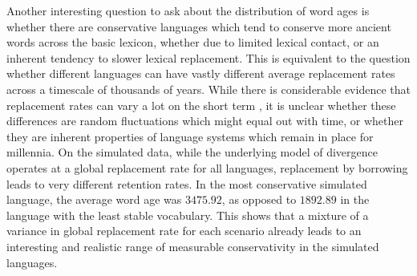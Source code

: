 Another interesting question to ask about the distribution of word ages is whether there are conservative languages which tend to conserve more ancient words across the basic lexicon, whether due to limited lexical contact, or an inherent tendency to slower lexical replacement. This is equivalent to the question whether different languages can have vastly different average replacement rates across a timescale of thousands of years. While there is considerable evidence that replacement rates can vary a lot on the short term \citep{atkinson_ea_2008}, it is unclear whether these differences are random fluctuations which might equal out with time, or whether they are inherent properties of language systems which remain in place for millennia. On the simulated data, while the underlying model of divergence operates at a global replacement rate for all languages, replacement by borrowing leads to very different retention rates. In the most conservative simulated language, the average word age was $3475.92$, as 
opposed to $1892.89$ in the language with the least stable vocabulary. This shows that a mixture of a variance in global replacement rate for each scenario already leads to an interesting and realistic range of measurable conservativity in the simulated languages.

